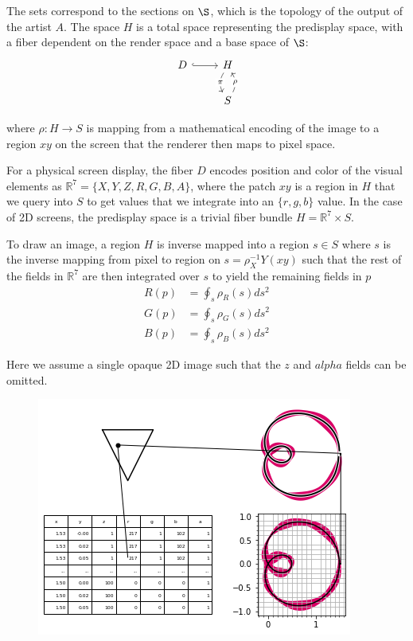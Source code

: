 \documentclass[../main.tex]{subfiles}
\begin{document}
The sets correspond to the sections on $\S$, which is the topology of the output of the artist $A$. The space $H$ is a total space representing the predisplay space, with a fiber dependent on the render space and a base space of $\S$:
\begin{equation}
    \begin{tikzcd}
        D \arrow[r, hook] & H \arrow[d, "\pi" description, bend right] \\
                                    & S \arrow[u, "\rho" description, bend right] 
    \end{tikzcd}
\end{equation}

where $\rho: H \rightarrow S$ is mapping from a mathematical encoding of the image to a region $xy$ on the screen that the renderer then maps to pixel space. 

For a physical screen display, the fiber $D$ encodes position and color of the visual elements as $\mathbb{R}^{7} = \{X, Y, Z, R, G, B, A\}$, where the patch $xy$ is a region in $H$ that we query into $S$ to get values that we integrate into an $\{r, g, b\}$ value. In the case of 2D screens, the predisplay space is a trivial fiber bundle $H=\mathbb{R}^{7}\times S$.

To draw an image, a region  $H$ is inverse mapped into a region $s \in S$ where $s$ is the inverse mapping from pixel to region on $s = \rho^{-1}_XY(xy)$ such that the rest of the fields in $\mathbb{R}^{7}$ are then integrated over $s$ to yield the remaining fields in $p$
\begin{align}
    R(p) &= \oint_s \rho_R(s)ds^{2}\\
    G(p) &= \oint_s \rho_G(s)ds^{2}\\
    B(p) &= \oint_s \rho_B(s)ds^{2}
\end{align}

Here we assume a single opaque 2D image such that the $z$ and $alpha$ fields can be omitted. 

\begin{figure}[h]
    \includegraphics[width=.4\linewidth]{figures/sections/math/render.png}
    \caption{}
    \label{fig:render}
\end{figure}
\end{document}
